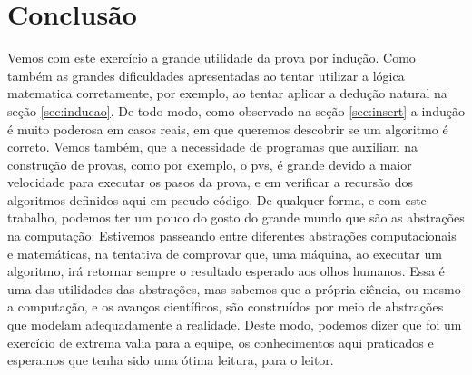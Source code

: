 \documentclass[a4paper, 10pt]{article}
\begin{document}
\section{Conclusão}
Vemos com este exercício a grande utilidade da prova por indução. Como também as grandes dificuldades apresentadas ao tentar utilizar a lógica matematica corretamente, por exemplo, ao tentar aplicar a dedução natural na seção \ref{sec:inducao}. 
De todo modo, como observado na seção \ref{sec:insert} a indução é muito poderosa em casos reais, em que queremos descobrir se um algoritmo é correto. Vemos também, que a necessidade de programas que auxiliam na construção de provas, como por exemplo, o pvs, é grande devido a maior velocidade para executar os pasos da prova, e em verificar a recursão dos algoritmos definidos aqui em pseudo-código. 
De qualquer forma, e com este trabalho, podemos ter um pouco do gosto do grande mundo que são as abstrações na computação: Estivemos passeando entre diferentes abstrações computacionais e matemáticas, na tentativa de comprovar que, uma máquina, ao executar um algoritmo, irá retornar sempre o resultado esperado aos olhos humanos. Essa é uma das utilidades das abstrações, mas sabemos que a própria ciência, ou mesmo a computação, e os avanços científicos, são construídos por meio de abstrações que modelam adequadamente a realidade. 
Deste modo, podemos dizer que foi um exercício de extrema valia para a equipe, os conhecimentos aqui praticados e esperamos que tenha sido uma ótima leitura, para o leitor. 
\end{document}
